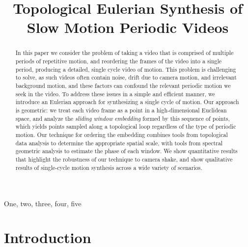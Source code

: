 \documentclass{article}
\title{Topological Eulerian Synthesis of Slow Motion Periodic Videos}
\begin{document}
%
\maketitle
%


\begin{abstract}

In this paper we consider the problem of taking a video that is comprised of multiple periods of repetitive motion, and reordering the frames of the video into a single period, producing a detailed, single cycle video of motion.
This problem is challenging to solve, as such videos often contain noise, drift due to camera motion, and irrelevant background motion, and these factors can confound the relevant periodic motion we seek in the video.
To address these issues in a simple and efficient manner, we introduce an Eulerian approach for synthesizing a single cycle of motion.
Our approach is geometric: we treat each video frame as a point in a high-dimensional Euclidean space, and analyze the {\em sliding window embedding} formed by this sequence of points, which yields points sampled along a topological loop regardless of the type of periodic motion. %
Our technique for ordering the embedding combines tools from topological data analysis to determine the appropriate spatial scale, with tools from spectral geometric analysis to estimate the phase of each window.
We show quantitative results that highlight the robustness of our technique to camera shake, and show qualitative results of single-cycle motion synthesis across a wide variety of scenarios.

\end{abstract}
%
\begin{keywords}
One, two, three, four, five
\end{keywords}
%


\section{Introduction}
\end{document}
